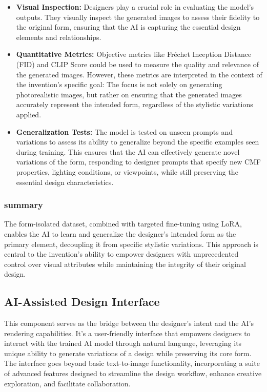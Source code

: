 \documentclass{article}
\begin{document}
\begin{itemize}
    \item \textbf{Visual Inspection:} Designers play a crucial role in evaluating the model's outputs. They visually inspect the generated images to assess their fidelity to the original form, ensuring that the AI is capturing the essential design elements and relationships.
    \item \textbf{Quantitative Metrics:} Objective metrics like Fréchet Inception Distance (FID) and CLIP Score could be used to measure the quality and relevance of the generated images. However, these metrics are interpreted in the context of the invention's specific goal: The focus is not solely on generating photorealistic images, but rather on ensuring that the generated images accurately represent the intended form, regardless of the stylistic variations applied.
    \item \textbf{Generalization Tests:} The model is tested on unseen prompts and variations to assess its ability to generalize beyond the specific examples seen during training. This ensures that the AI can effectively generate novel variations of the form, responding to designer prompts that specify new CMF properties, lighting conditions, or viewpoints, while still preserving the essential design characteristics.
\end{itemize}

\subsubsection{summary}
The form-isolated dataset, combined with targeted fine-tuning using LoRA, enables the AI to learn and generalize the designer's intended form as the primary element, decoupling it from specific stylistic variations. This approach is central to the invention's ability to empower designers with unprecedented control over visual attributes while maintaining the integrity of their original design.

\subsection{AI-Assisted Design Interface}

This component serves as the bridge between the designer's intent and the AI's rendering capabilities. It's a user-friendly interface that empowers designers to interact with the trained AI model through natural language, leveraging its unique ability to generate variations of a design while preserving its core form. The interface goes beyond basic text-to-image functionality, incorporating a suite of advanced features designed to streamline the design workflow, enhance creative exploration, and facilitate collaboration.
\end{document}
